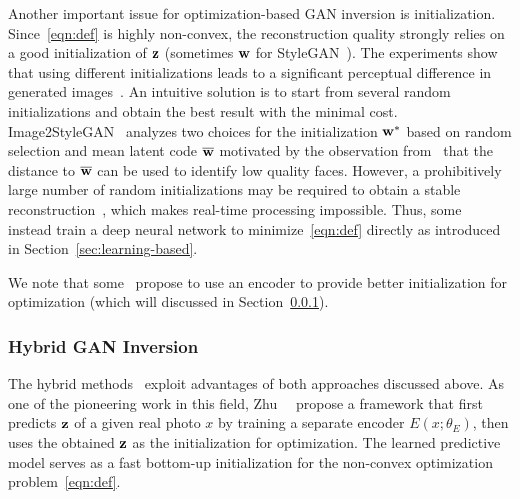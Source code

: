 Another important issue for optimization-based GAN inversion is initialization. 
Since~\eqref{eqn:def} is highly non-convex, the reconstruction quality strongly relies on a good initialization of $\mathbf{z}$ (sometimes $\mathbf{w}$ for StyleGAN~\cite{karras2019style}).
The experiments show that using different initializations leads to a significant perceptual difference in generated images~\cite{radford2016dcgan,brock2018large,karras2017progressive,karras2019style}. 
An intuitive solution is to start from several random initializations and obtain the best result with the minimal cost. 
Image2StyleGAN~\cite{abdal2019image2stylegan} analyzes two choices for the initialization $\mathbf{w}^{*}$ based on random selection and mean latent code $\overline{\mathbf{w}}$ motivated by the observation from~\cite{karras2019style} that the distance to $\overline{\mathbf{w}}$ can be used to identify low quality faces. 
However, a prohibitively large number of random initializations may be required to obtain a stable reconstruction~\cite{zhu2016generative}, which makes real-time processing impossible. 
Thus, some~\cite{zhu2016generative,tewari2020stylerig,guan2020faster} instead train a deep neural network to minimize~\eqref{eqn:def} directly as introduced in Section~\ref{sec:learning-based}.

We note that some~\cite{zhu2016generative,bau2019inverting,guan2020faster} propose to use an encoder to provide better initialization for optimization (which will discussed in Section~\ref{sec:hybrid}).

\subsubsection{Hybrid GAN Inversion}
\label{sec:hybrid}

The hybrid methods~\cite{zhu2016generative,bau2019seeing,bau2019inverting,zhu2020indomain,guan2020faster} exploit advantages of both approaches discussed above. 
As one of the pioneering work in this field, Zhu~\etal~\cite{zhu2016generative} propose a framework that first predicts $\mathbf{z}$ of a given real photo $x$ by training a separate encoder $E(x; \theta_E)$, then uses the obtained $\mathbf{z}$ as the initialization for optimization.
The learned predictive model serves as a fast bottom-up initialization for the non-convex optimization problem~\eqref{eqn:def}.

